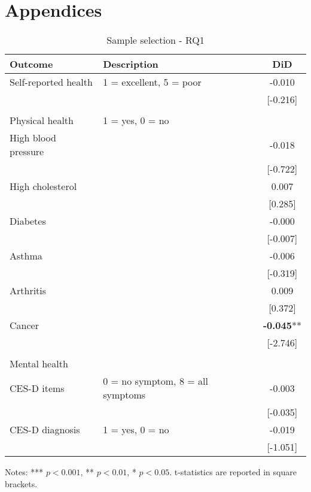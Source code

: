 \chapter{\label{app:1-cardiophys}Appendices}

\begin{table}[h!]
  \centering
  \caption{Sample selection - RQ1}
  \label{app:sample_selection_rq1}
  \begin{threeparttable}
      \begin{tabular}{llc}
          \toprule
          Outcome & Description & DiD \\
          \midrule
          Self-reported health & 1 = excellent, 5 = poor & -0.010 \\
          &  & [-0.216] \\
          & & \\
          Physical health & 1 = yes, 0 = no & \\
          High blood pressure &  & -0.018 \\
          &  & [-0.722] \\
          High cholesterol &  & 0.007 \\
          &  & [0.285] \\
          Diabetes &  & -0.000 \\
          &  & [-0.007] \\
          Asthma &  & -0.006 \\
          &  & [-0.319] \\
          Arthritis &  & 0.009 \\
          &  & [0.372] \\
          Cancer &  & \textbf{-0.045}** \\
          &  & [-2.746] \\
          & & \\
          Mental health & & \\
          CES-D items & 0 = no symptom, 8 = all symptoms & -0.003 \\
          &  & [-0.035] \\
          CES-D diagnosis & 1 = yes, 0 = no & -0.019 \\
          &  & [-1.051] \\
          \bottomrule
      \end{tabular}
      \begin{tablenotes}
          \footnotesize
          \item Notes: *** $p < 0.001$, ** $p < 0.01$, * $p < 0.05$. t-statistics are reported in square brackets.
      \end{tablenotes}
  \end{threeparttable}
\end{table}